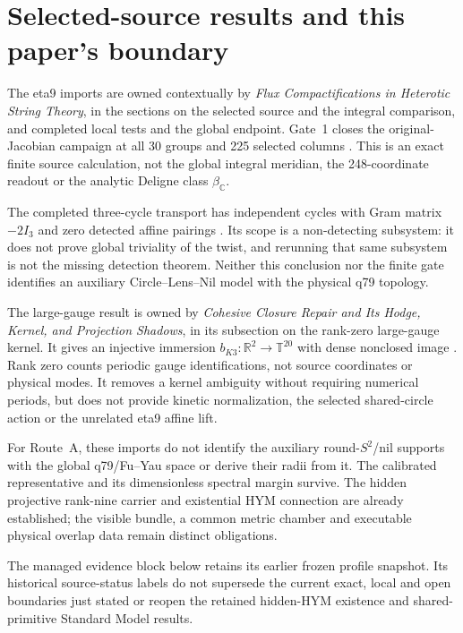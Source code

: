 \documentclass[11pt]{article}
\begin{document}
\section{Selected-source results and this paper's boundary}
\label{sec:theta-source-consumers}

The eta9 imports are owned contextually by \emph{Flux Compactifications in
Heterotic String Theory}, in the sections on the selected source and the
integral comparison, and completed local tests and the global endpoint.
Gate~1 closes the original-Jacobian campaign at all 30 groups and 225 selected
columns \cite{ThetaGate1}. This is an exact finite source calculation, not
the global integral meridian, the 248-coordinate readout or the analytic
Deligne class $\beta_{\mathbb C}$.

The completed three-cycle transport has independent cycles with Gram matrix
$-2I_3$ and zero detected affine pairings \cite{ThetaCycles}. Its scope is
a non-detecting subsystem: it does not prove global triviality of the twist,
and rerunning that same subsystem is not the missing detection theorem.
Neither this conclusion nor the finite gate identifies an auxiliary
Circle--Lens--Nil model with the physical q79 topology.

The large-gauge result is owned by \emph{Cohesive Closure Repair and Its
Hodge, Kernel, and Projection Shadows}, in its subsection on the rank-zero
large-gauge kernel. It gives an injective immersion
$b_{K3}:\mathbb R^2\to\mathbb T^{20}$ with dense nonclosed image
\cite{ThetaBK3}. Rank zero counts periodic gauge identifications, not source
coordinates or physical modes. It removes a kernel ambiguity without
requiring numerical periods, but does not provide kinetic normalization,
the selected shared-circle action or the unrelated eta9 affine lift.

For Route~A, these imports do not identify the auxiliary round-$S^2$/nil
supports with the global q79/Fu--Yau space or derive their radii from it.
The calibrated representative and its dimensionless spectral margin survive.
The hidden projective rank-nine carrier and existential HYM connection are
already established; the visible bundle, a common metric chamber and
executable physical overlap data remain distinct obligations.


The managed evidence block below retains its earlier frozen profile snapshot.
Its historical source-status labels do not supersede the current exact,
local and open boundaries just stated or reopen the retained hidden-HYM
existence and shared-primitive Standard Model results.
\end{document}
